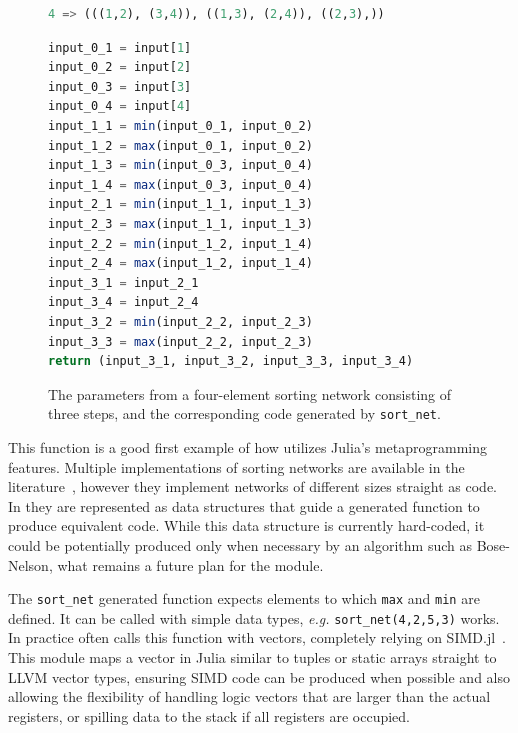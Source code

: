 \documentclass{juliacon}
\begin{document}
\begin{figure}[htb]
\begin{lstlisting}[language = Julia]
4 => (((1,2), (3,4)), ((1,3), (2,4)), ((2,3),))
\end{lstlisting}
\begin{lstlisting}[language = Julia]
input_0_1 = input[1]
input_0_2 = input[2]
input_0_3 = input[3]
input_0_4 = input[4]
input_1_1 = min(input_0_1, input_0_2)
input_1_2 = max(input_0_1, input_0_2)
input_1_3 = min(input_0_3, input_0_4)
input_1_4 = max(input_0_3, input_0_4)
input_2_1 = min(input_1_1, input_1_3)
input_2_3 = max(input_1_1, input_1_3)
input_2_2 = min(input_1_2, input_1_4)
input_2_4 = max(input_1_2, input_1_4)
input_3_1 = input_2_1
input_3_4 = input_2_4
input_3_2 = min(input_2_2, input_2_3)
input_3_3 = max(input_2_2, input_2_3)
return (input_3_1, input_3_2, input_3_3, input_3_4)
\end{lstlisting}
\caption{The parameters from a four-element sorting network consisting of three steps, and the corresponding code generated by {\tt sort\_net}.}
\label{fig:sort-net-listing}
\end{figure}

This function is a good first example of how \chipsort utilizes Julia's metaprogramming features. Multiple implementations of sorting networks are available in the literature~\cite{DBLP:journals/pvldb/ChhuganiNLMHCBKD08,sortingnetworksjl,ultrasort}, however they implement networks of different sizes straight as code. In \chipsort they are represented as data structures that guide a generated function to produce equivalent code. While this data structure is currently hard-coded, it could be potentially produced only when necessary by an algorithm such as Bose-Nelson, what remains a future plan for the module.

The {\tt sort\_net} generated function expects elements to which {\tt max} and {\tt min} are defined. It can be called with simple data types, {\em e.g.} {\tt sort\_net(4,2,5,3)} works. In practice \chipsort often calls this function with vectors, completely relying on SIMD.jl~\cite{erik_schnetter_2019_2592633}. This module maps a vector in Julia similar to tuples or static arrays straight to LLVM vector types, ensuring SIMD code can be produced when possible and also allowing the flexibility of handling logic vectors that are larger than the actual registers, or spilling data to the stack if all registers are occupied.
\end{document}
